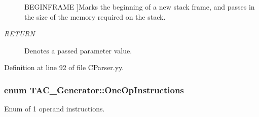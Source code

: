 \begin{Desc}
\begin{description}
{\hypertarget{classTAC__Generator_ab58b7044cb5d16a454f4e01514175123a2900d0c97873b8e4282491148b366771}{B\-E\-G\-I\-N\-F\-R\-A\-M\-E}\label{classTAC__Generator_ab58b7044cb5d16a454f4e01514175123a2900d0c97873b8e4282491148b366771}
}]Marks the beginning of a new stack frame, and passes in the size of the memory required on the stack. \item[{\em 
\hypertarget{classTAC__Generator_ab58b7044cb5d16a454f4e01514175123a0e868fa94bac0750a62dfa98d0f56510}{R\-E\-T\-U\-R\-N}\label{classTAC__Generator_ab58b7044cb5d16a454f4e01514175123a0e868fa94bac0750a62dfa98d0f56510}
}]Denotes a passed parameter value. \end{description}
\end{Desc}


Definition at line 92 of file C\-Parser.\-yy.

\hypertarget{classTAC__Generator_ab58b7044cb5d16a454f4e01514175123}{
\subsubsection[{One\-Op\-Instructions}]{\setlength{\rightskip}{0pt plus 5cm}enum {\bf T\-A\-C\-\_\-\-Generator\-::\-One\-Op\-Instructions}}}\label{classTAC__Generator_ab58b7044cb5d16a454f4e01514175123}


Enum of 1 operand instructions. 

